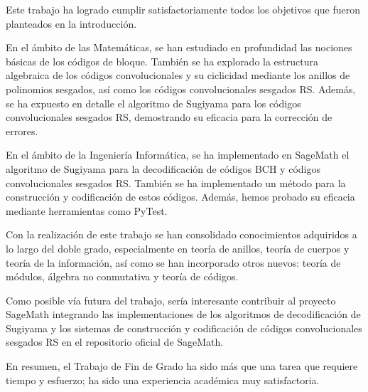

\label{ch:Conclusiones}

Este trabajo ha logrado cumplir satisfactoriamente todos los objetivos que fueron planteados en la introducción. 

En el ámbito de las Matemáticas, se han estudiado en profundidad las nociones básicas de los códigos de bloque. También se ha explorado la estructura algebraica de los códigos convolucionales y su ciclicidad mediante los anillos de polinomios sesgados, así como los códigos convolucionales sesgados RS. Además, se ha expuesto en detalle el algoritmo de Sugiyama para los códigos convolucionales sesgados RS, demostrando su eficacia para la corrección de errores. 

En el ámbito de la Ingeniería Informática, se ha implementado en SageMath el algoritmo de Sugiyama para la decodificación de códigos BCH y códigos convolucionales sesgados RS. También se ha implementado un método para la construcción y codificación de estos códigos. Además, hemos probado su eficacia mediante herramientas como PyTest.

Con la realización de este trabajo se han consolidado conocimientos adquiridos a lo largo del doble grado, especialmente en teoría de anillos, teoría de cuerpos y teoría de la información, así como se han incorporado otros nuevos: teoría de módulos, álgebra no conmutativa y teoría de códigos.

Como posible vía futura del trabajo, sería interesante contribuir al proyecto SageMath integrando las implementaciones de los algoritmos de decodificación de Sugiyama y los sistemas de construcción y codificación de códigos convolucionales sesgados RS en el repositorio oficial de SageMath.

En resumen, el Trabajo de Fin de Grado ha sido más que una tarea que requiere tiempo y esfuerzo; ha sido una experiencia académica muy satisfactoria.



\endinput
